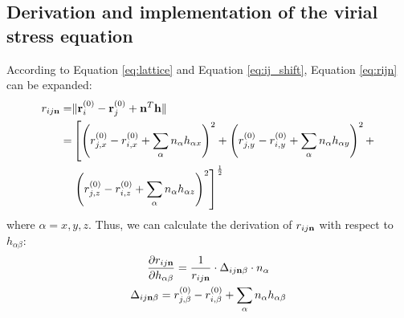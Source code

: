 \documentclass[prb,preprint]{revtex4-2}
\begin{document}
{\subsection{Derivation and implementation of the virial stress equation}

According to Equation \ref{eq:lattice} and Equation \ref{eq:ij_shift}, Equation 
\ref{eq:rijn} can be expanded:
\begin{align}
r_{ij\mathbf{n}} = & \Vert \mathbf{r}_i^{(0)} - \mathbf{r}_j^{(0)} + 
           \mathbf{n}^T \mathbf{h} \Vert \nonumber \\
      = & \left[
                 \left(r_{j,x}^{(0)} - r_{i,x}^{(0)} + 
                       \sum_{\alpha}{n_{\alpha}h_{\alpha x}} \right)^2 +
                 \left(r_{j,y}^{(0)} - r_{i,y}^{(0)} + 
                       \sum_{\alpha}{n_{\alpha}h_{\alpha y}} \right)^2 + \right.
        \nonumber \\
        & \left. \left(r_{j,z}^{(0)} - r_{i,z}^{(0)} + 
                       \sum_{\alpha}{n_{\alpha}h_{\alpha z}} \right)^2 
          \right]^{\frac{1}{2}}
\end{align}
where $\alpha=x,y,z$. Thus, we can calculate the derivation of $r_{ij\mathbf{n}}$ with 
respect to $h_{\alpha\beta}$:
\begin{gather}
\frac{\partial r_{ij\mathbf{n}}}{\partial h_{\alpha\beta}} = 
    \frac{1}{r_{ij\mathbf{n}}} \cdot \Delta_{ij\mathbf{n}\beta} \cdot n_{\alpha} \\
\Delta_{ij\mathbf{n}\beta} = r_{j,\beta}^{(0)} - r_{i,\beta}^{(0)} + 
    \sum_{\alpha}{n_{\alpha}h_{\alpha \beta}}
\end{gather}

\newcommand{\hab}{h_{\alpha\beta}}
\newcommand{\hga}{h_{\gamma\alpha}}
\newcommand{\hgb}{h_{\gamma\beta}}

}
\end{document}
